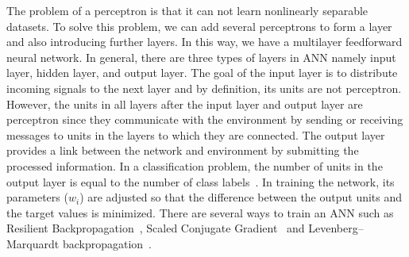 The problem of a perceptron is that it can not learn nonlinearly separable datasets. To solve this problem, we can add several perceptrons to form a layer and also introducing further layers. In this way, we have a multilayer feedforward neural network. In general, there are three types of layers in ANN namely input layer, hidden layer, and output layer. The goal of the input layer is to distribute incoming signals to the next layer and by definition, its units are not perceptron. However, the units in all layers after the input layer and output layer are perceptron since they communicate with the environment by sending or receiving messages to units in the layers to which they are connected. The output layer provides a link between the network and environment by submitting the processed information. In a classification problem, the number of units in the output layer is equal to the number of class labels~\cite{sharma2008high}. In training the network, its parameters ($w_i$) are adjusted so that the difference between the output units and the target values is minimized. There are several ways to train an ANN such as Resilient Backpropagation~\cite{riedmiller1993direct}, Scaled Conjugate Gradient~\cite{moller1993scaled} and Levenberg–Marquardt backpropagation~\cite{hagan1994training}. 





